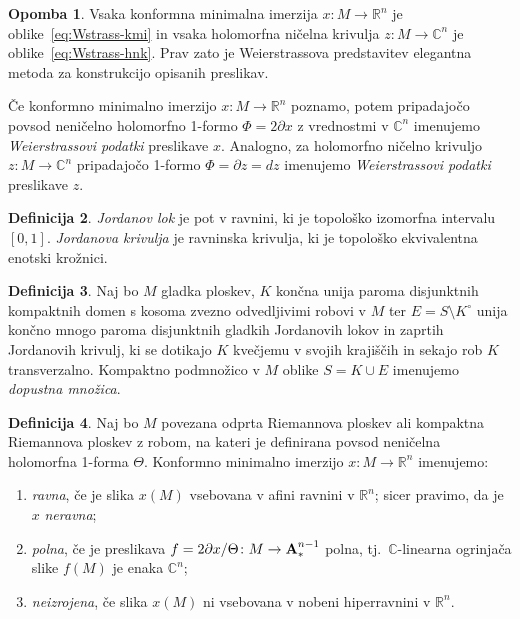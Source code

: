 \documentclass[12pt,a4paper,twoside]{article}
\theoremstyle{definition} %
\newtheorem{definicija}{Definicija}[section]
\newtheorem{opomba}[definicija]{Opomba}
\theoremstyle{plain} %
\numberwithin{equation}{section}  %
\newcommand{\R}{\mathbb R}
\newcommand{\C}{\mathbb C}
\begin{document}
\begin{opomba}
Vsaka konformna minimalna imerzija $x \colon M \to \R^{n}$ je oblike~\ref{eq:Wstrass-kmi} in vsaka holomorfna ničelna krivulja $z \colon M \to \C^{n}$ je oblike~\ref{eq:Wstrass-hnk}. Prav zato je Weierstrassova predstavitev elegantna metoda za konstrukcijo opisanih preslikav.
\end{opomba}

Če konformno minimalno imerzijo $x \colon M \to \R^{n}$ poznamo, potem pripadajočo povsod neničelno holomorfno 1-formo $\Phi = 2 \partial{x}$ z vrednostmi v $\C^{n}$ imenujemo \emph{Weierstrassovi podatki} preslikave $x$. 
Analogno, za holomorfno ničelno krivuljo $z \colon M \to \C^{n}$ pripadajočo 1-formo $\Phi = \partial{z} = dz$ imenujemo \emph{Weierstrassovi podatki} preslikave $z$.

\begin{definicija}
\emph{Jordanov lok} je pot v ravnini, ki je topološko izomorfna intervalu $[0,1]$.
\emph{Jordanova krivulja} je ravninska krivulja, ki je topološko ekvivalentna enotski krožnici.
\end{definicija}

\begin{definicija}
Naj bo $M$ gladka ploskev, $K$ končna unija paroma disjunktnih kompaktnih domen s kosoma zvezno odvedljivimi robovi v $M$ ter $E = S \setminus K^\circ$ unija končno mnogo paroma disjunktnih gladkih Jordanovih lokov in zaprtih Jordanovih krivulj, ki se dotikajo $K$ kvečjemu v svojih krajiščih in sekajo rob $K$ transverzalno. Kompaktno podmnožico v $M$ oblike $S = K \cup E$ imenujemo \emph{dopustna množica}.
\end{definicija}

\begin{definicija}
Naj bo $M$ povezana odprta Riemannova ploskev ali kompaktna Riemannova ploskev z robom, na kateri je definirana povsod neničelna holomorfna 1-forma $\Theta$. Konformno minimalno imerzijo $x \colon M \to \R^{n}$ imenujemo:
\begin{enumerate}
\item \emph{ravna}, če je slika $x(M)$ vsebovana v afini ravnini v $\R^{n}$; sicer pravimo, da je $x$ \emph{neravna};
\item \emph{polna}, če je preslikava $f = 2 \partial{x} / \Theta \colon M \to \textbf{\textup{A}}_{*}^{n-1}$ polna, tj.\ $\C$-linearna ogrinjača slike $f(M)$ je enaka $\C^{n}$;
\item \emph{neizrojena}, če slika $x(M)$ ni vsebovana v nobeni hiperravnini v $\R^{n}$. 
\end{enumerate}
\end{definicija}
\end{document}
